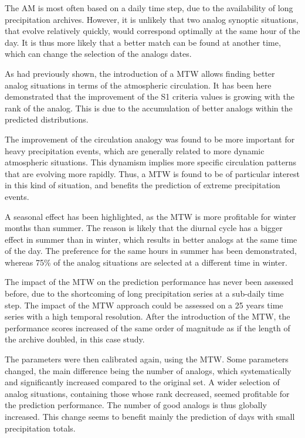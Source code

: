 \documentclass[hess, manuscript]{copernicus}
\begin{document}
\conclusions  %

The AM is most often based on a daily time step, due to the availability of long precipitation archives. However, it is unlikely that two analog synoptic situations, that evolve relatively quickly, would correspond optimally at the same hour of the day. It is thus more likely that a better match can be found at another time, which can change the selection of the analogs dates.

As \citet{Finet2008} had previously shown, the introduction of a MTW allows finding better analog situations in terms of the atmospheric circulation. It has been here demonstrated that the improvement of the S1 criteria values is growing with the rank of the analog. This is due to the accumulation of better analogs within the predicted distributions.

The improvement of the circulation analogy was found to be more important for heavy precipitation events, which are generally related to more dynamic atmospheric situations. This dynamism implies more specific circulation patterns that are evolving more rapidly. Thus, a MTW is found to be of particular interest in this kind of situation, and benefits the prediction of extreme precipitation events.

A seasonal effect has been highlighted, as the MTW is more profitable for winter months than summer. The reason is likely that the diurnal cycle has a bigger effect in summer than in winter, which results in better analogs at the same time of the day. The preference for the same hours in summer has been demonstrated, whereas 75\% of the analog situations are selected at a different time in winter.

The impact of the MTW on the prediction performance has never been assessed before, due to the shortcoming of long precipitation series at a sub-daily time step. The impact of the MTW approach could be assessed on a 25 years time series with a high temporal resolution. After the introduction of the MTW, the performance scores increased of the same order of magnitude as if the length of the archive doubled, in this case study.

The parameters were then calibrated again, using the MTW. Some parameters changed, the main difference being the number of analogs, which systematically and significantly increased compared to the original set. A wider selection of analog situations, containing those whose rank decreased, seemed profitable for the prediction performance. The number of good analogs is thus globally increased. This change seems to benefit mainly the prediction of days with small precipitation totals.
\end{document}
